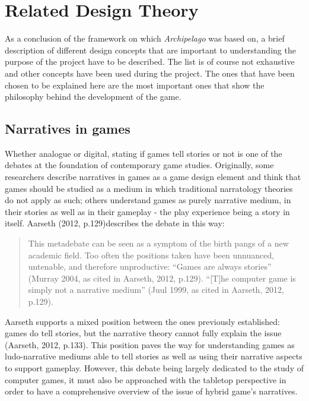 \section{Related Design Theory}
As a conclusion of the framework on which \textit{Archipelago} was based on, a brief description of different design concepts that are important to understanding the purpose of the project have to be described. The list is of course not exhaustive and other concepts have been used during the project. The ones that have been chosen to be explained here are the most important ones that show the philosophy behind the development of the game. 
\subsection{Narratives in games}
Whether analogue or digital, stating if games tell stories or not is one of the debates at the foundation of contemporary game studies. Originally, some researchers describe narratives in games as a game design element and think that games should be studied as a medium in which traditional narratology theories do not apply as such; others understand games as purely narrative medium, in their stories as well as in their gameplay - the play experience being a story in itself. Aarseth (2012, p.129)\cite{art:aarseth}describes the debate in this way:
\begin{quotation}
This metadebate can be seen as a symptom of the birth pangs of a new academic field. Too often the positions taken have been unnuanced, untenable, and therefore unproductive: “Games are always stories” (Murray 2004, as cited in Aarseth, 2012, p.129). “[T]he computer game is simply not a narrative medium” (Juul 1999, as cited in Aarseth, 2012, p.129).
\end{quotation}
Aarseth supports a mixed position between the ones previously established: games do tell stories, but the narrative theory cannot fully explain the issue (Aarseth, 2012, p.133). This position paves the way for understanding games as ludo-narrative mediums able to tell stories as well as using their narrative aspects to support gameplay. However, this debate being largely dedicated to the study of computer games, it must also be approached with the tabletop perspective in order to have a comprehensive overview of the issue of hybrid game's narratives.


